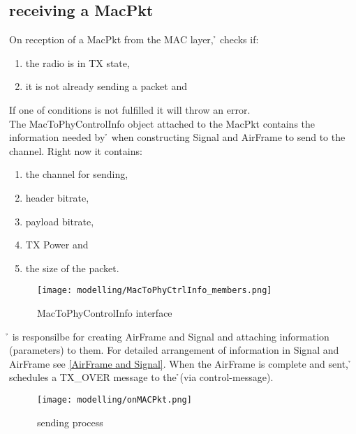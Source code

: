 \subsection{receiving a MacPkt}

On reception of a MacPkt from the MAC layer, \h{\bp} checks if:
\begin{enumerate}
	\item the radio is in TX state,
	\item it is not already sending a packet and
\end{enumerate} 

If one of conditions is not fulfilled it will throw an error.\\

The MacToPhyControlInfo object attached to the MacPkt contains the information needed by \h{\bp} when constructing Signal and AirFrame to send to the channel. Right now it contains:

\begin{enumerate}
	\item the channel for sending,
	\item header bitrate,
	\item payload bitrate,
	\item TX Power and
	\item the size of the packet.

\end{enumerate}


\begin{figure}[H]
 \centering
 \texttt{[image: modelling/MacToPhyCtrlInfo\_members.png]}
 \caption{MacToPhyControlInfo interface}
 \label{fig: MacToPhyCtrlInfo interface}
\end{figure}

\h{\bp} is responsilbe for creating AirFrame and Signal and attaching information (parameters) to them. For detailed arrangement of information in Signal and AirFrame see \ref{AirFrame and Signal}.
When the AirFrame is complete and sent, \h{\bp} schedules a TX\_OVER message to the \h{\bm}(via control-message).

\begin{figure}[H]
 \centering
 \texttt{[image: modelling/onMACPkt.png]}
 \caption{sending process}
 \label{fig: sending process}
\end{figure}





